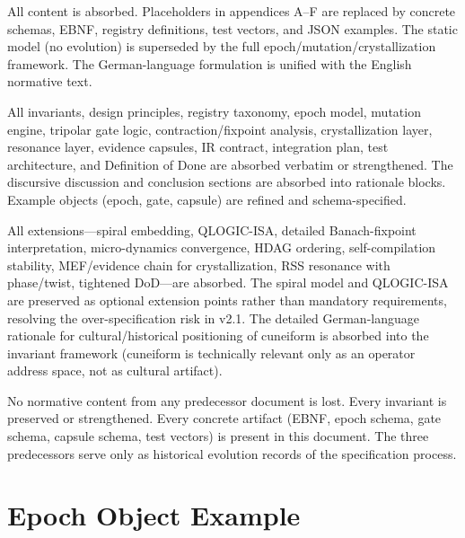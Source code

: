\documentclass[11pt,a4paper,twoside]{article}
\theoremstyle{definition}
\theoremstyle{remark}
\begin{document}
\begin{description}[style=nextline,leftmargin=1cm]
  \item[v1.0 (COL\_de, German outline)]
  All content is absorbed. Placeholders in appendices A--F are replaced by concrete schemas, EBNF, registry definitions, test vectors, and JSON examples. The static model (no evolution) is superseded by the full epoch/mutation/crystallization framework. The German-language formulation is unified with the English normative text.

  \item[v2.0 (English specification)]
  All invariants, design principles, registry taxonomy, epoch model, mutation engine, tripolar gate logic, contraction/fixpoint analysis, crystallization layer, resonance layer, evidence capsules, IR contract, integration plan, test architecture, and Definition of Done are absorbed verbatim or strengthened. The discursive discussion and conclusion sections are absorbed into rationale blocks. Example objects (epoch, gate, capsule) are refined and schema-specified.

  \item[v2.1 (Keilschrift++)]
  All extensions---spiral embedding, QLOGIC-ISA, detailed Banach-fixpoint interpretation, micro-dynamics convergence, HDAG ordering, self-compilation stability, MEF/evidence chain for crystallization, RSS resonance with phase/twist, tightened DoD---are absorbed. The spiral model and QLOGIC-ISA are preserved as optional extension points rather than mandatory requirements, resolving the over-specification risk in v2.1. The detailed German-language rationale for cultural/historical positioning of cuneiform is absorbed into the invariant framework (cuneiform is technically relevant only as an operator address space, not as cultural artifact).
\end{description}

No normative content from any predecessor document is lost. Every invariant is preserved or strengthened. Every concrete artifact (EBNF, epoch schema, gate schema, capsule schema, test vectors) is present in this document. The three predecessors serve only as historical evolution records of the specification process.



\appendix

\section{Epoch Object Example}
\label{app:epoch}
\end{document}
